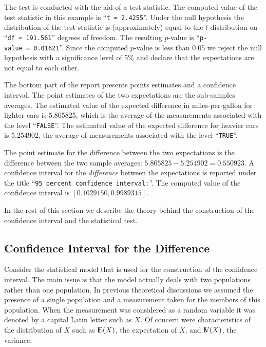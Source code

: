 \documentclass[]{krantz}
\newcommand{\Expec}{{\rm I\kern-.3em E}}
\newcommand{\Var}{{\rm I\kern-.3em V}}
\theoremstyle{definition}
\theoremstyle{definition}
\theoremstyle{definition}
\theoremstyle{remark}
\begin{document}
The test is conducted with the aid of a test statistic. The computed
value of the test statistic in this example is
``\texttt{t\ =\ 2.4255}''. Under the null hypothesis the distribution of
the test statistic is (approximately) equal to the \(t\)-distribution on
``\texttt{df\ =\ 191.561}'' degrees of freedom. The resulting
\(p\)-value is ``\texttt{p-value\ =\ 0.01621}''. Since the computed
\(p\)-value is less than 0.05 we reject the null hypothesis with a
significance level of 5\% and declare that the expectations are not
equal to each other.

The bottom part of the report presents points estimates and a confidence
interval. The point estimates of the two expectations are the
sub-samples averages. The estimated value of the expected difference in
miles-per-gallon for lighter cars is 5.805825, which is the average of
the measurements associated with the level ``\texttt{FALSE}''. The
estimated value of the expected difference for heavier cars is 5.254902,
the average of measurements associated with the level ``\texttt{TRUE}''.

The point estimate for the difference between the two expectations is
the difference between the two sample averages:
\(5.805825 - 5.254902 = 0.550923\). A confidence interval for the
\emph{difference} between the expectations is reported under the title
``\texttt{95\ percent\ confidence\ interval:}''. The computed value of
the confidence interval is \([0.1029150, 0.9989315]\).

In the rest of this section we describe the theory behind the
construction of the confidence interval and the statistical test.

\subsection{Confidence Interval for the
Difference}\label{confidence-interval-for-the-difference}

Consider the statistical model that is used for the construction of the
confidence interval. The main issue is that the model actually deals
with two populations rather than one population. In previous theoretical
discussions we assumed the presence of a single population and a
measurement taken for the members of this population. When the
measurement was considered as a random variable it was denoted by a
capital Latin letter such as \(X\). Of concern were characteristics of
the distribution of \(X\) such as \(\Expec(X)\), the expectation of
\(X\), and \(\Var(X)\), the variance.
\end{document}
